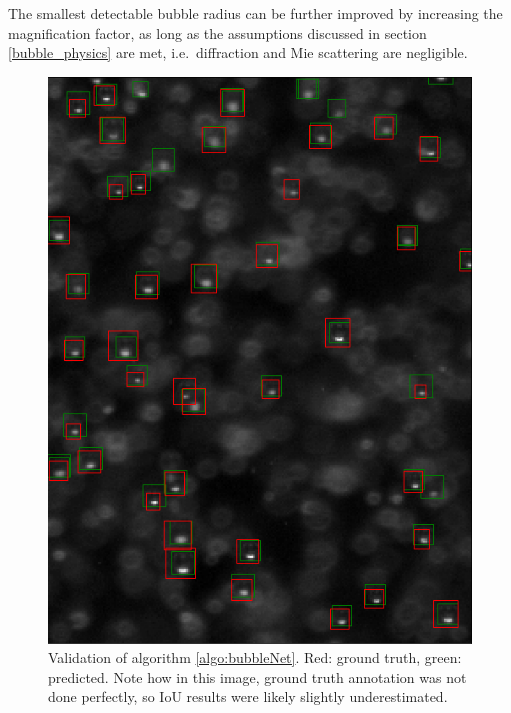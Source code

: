 			 The smallest detectable bubble radius can be further improved by increasing the magnification factor, as long as the assumptions discussed in section \ref{bubble_physics} are met, i.e.\ diffraction and Mie scattering are negligible. 
			 
			 
			
			\begin{figure}
				\centering
				\includegraphics[scale=0.8]{images/bubbleNet_validation_result.png}
				\caption{Validation of algorithm \ref{algo:bubbleNet}. Red: ground truth, green: predicted. Note how in this image, ground truth annotation was not done perfectly, so IoU results were likely slightly underestimated.}
				\label{fig:bubbleNet_result}
			\end{figure}


